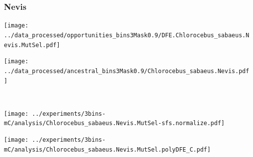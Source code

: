 \subsubsection{Nevis}

\begin{minipage}{0.49\linewidth}
    \texttt{[image: ../data\_processed/opportunities\_bins3Mask0.9/DFE.Chlorocebus\_sabaeus.Nevis.MutSel.pdf]}
\end{minipage}
\begin{minipage}{0.49\linewidth}
    \texttt{[image: ../data\_processed/ancestral\_bins3Mask0.9/Chlorocebus\_sabaeus.Nevis.pdf]}
\end{minipage}
\\
\begin{minipage}{0.49\linewidth}
    \texttt{[image: ../experiments/3bins-mC/analysis/Chlorocebus\_sabaeus.Nevis.MutSel-sfs.normalize.pdf]}
\end{minipage}
\begin{minipage}{0.4\linewidth}
    \texttt{[image: ../experiments/3bins-mC/analysis/Chlorocebus\_sabaeus.Nevis.MutSel.polyDFE\_C.pdf]}
\end{minipage}
